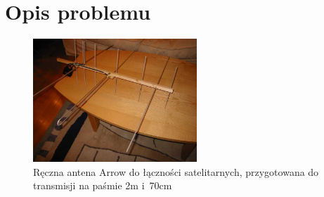 \documentclass[eng,oneside]{mgr}
\begin{document}
	\chapter{Opis problemu}
	\label{sec:problem_description}
	\begin{figure}
		\vspace{-20pt}
		\begin{center}
			\includegraphics[width=0.55\textwidth]{arrow1}
		\end{center}
		\vspace{-20pt}
		\caption{Ręczna antena Arrow do łączności satelitarnych, przygotowana do transmisji na paśmie 2m i~70cm}
		\vspace{-20pt}
		\label{fig:example_handheld_arrow_antenna}
	\end{figure}
\end{document}
